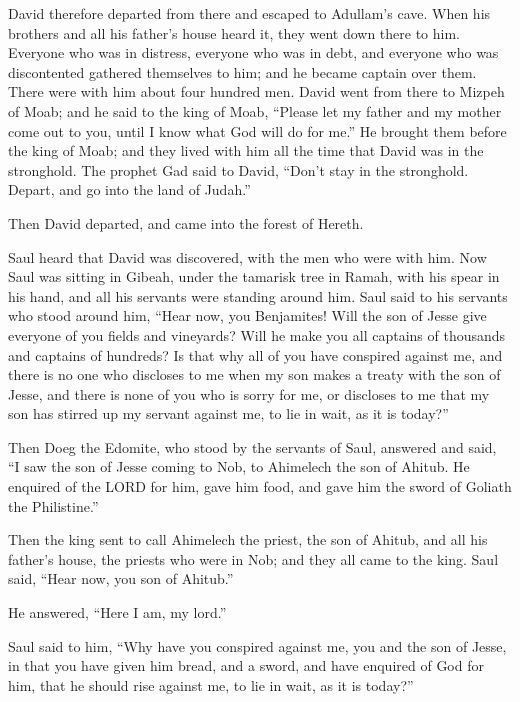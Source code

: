  David therefore departed from there and escaped to
Adullam's cave. When his brothers and all his father's house heard it,
they went down there to him.  Everyone who was in
distress, everyone who was in debt, and everyone who was discontented
gathered themselves to him; and he became captain over them. There were
with him about four hundred men.  David went from there to
Mizpeh of Moab; and he said to the king of Moab, ``Please let my father
and my mother come out to you, until I know what God will do for me.''
 He brought them before the king of Moab; and they lived
with him all the time that David was in the stronghold. 
The prophet Gad said to David, ``Don't stay in the stronghold. Depart,
and go into the land of Judah.''

Then David departed, and came into the forest of Hereth.

 Saul heard that David was discovered, with the men who
were with him. Now Saul was sitting in Gibeah, under the tamarisk tree
in Ramah, with his spear in his hand, and all his servants were standing
around him.  Saul said to his servants who stood around
him, ``Hear now, you Benjamites! Will the son of Jesse give everyone of
you fields and vineyards? Will he make you all captains of thousands and
captains of hundreds?  Is that why all of you have
conspired against me, and there is no one who discloses to me when my
son makes a treaty with the son of Jesse, and there is none of you who
is sorry for me, or discloses to me that my son has stirred up my
servant against me, to lie in wait, as it is today?''

 Then Doeg the Edomite, who stood by the servants of Saul,
answered and said, ``I saw the son of Jesse coming to Nob, to Ahimelech
the son of Ahitub.  He enquired of the LORD for him, gave
him food, and gave him the sword of Goliath the Philistine.''

 Then the king sent to call Ahimelech the priest, the son
of Ahitub, and all his father's house, the priests who were in Nob; and
they all came to the king.  Saul said, ``Hear now, you
son of Ahitub.''

He answered, ``Here I am, my lord.''

 Saul said to him, ``Why have you conspired against me,
you and the son of Jesse, in that you have given him bread, and a sword,
and have enquired of God for him, that he should rise against me, to lie
in wait, as it is today?''

